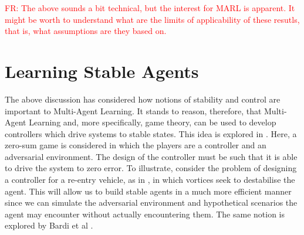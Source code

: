 \documentclass[preprint,11pt]{report}
\newcommand\fr[1]{\textcolor{red}{FR: #1}}
\begin{document}
\fr{The above sounds a bit technical, but the interest for MARL is apparent. It might be worth to understand what are the limits of applicability of these resutls, that is, what assumptions are they based on.}

\section{Learning Stable Agents}

The above discussion has considered how notions of stability and control are important to
Multi-Agent Learning. It stands to reason, therefore, that Multi-Agent Learning and, more
specifically, game theory, can be used to develop controllers which drive systems to stable states.
This idea is explored in \cite{Marden2018AnnualControl}. Here, a zero-sum game is considered in
which the players are a controller and an adversarial environment. The design of the controller must
be such that it is able to drive the system to zero error. To illustrate, consider the problem of
designing a controller for a re-entry vehicle, as in \cite{Breitner1994ReentryGame}, in which
vortices seek to destabilise the agent. This will allow us to build stable agents in a much more
efficient manner since we can simulate the adversarial environment and hypothetical scenarios the
agent may encounter without actually encountering them. The same notion is explored by Bardi et al
\cite{Bardi1991DifferentialDisturbances}.
\end{document}
